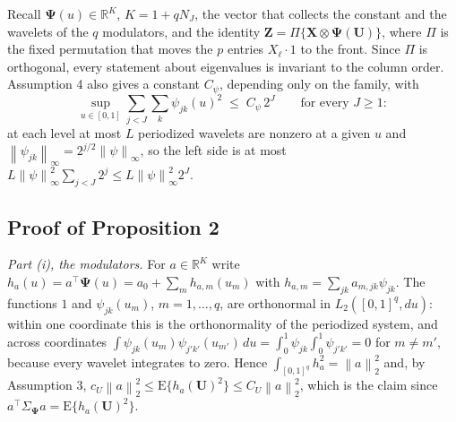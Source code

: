 \documentclass[10pt]{book}
\theoremstyle{definition}
\newcommand{\R}{\mathbb{R}}
\newcommand{\E}{\mathrm{E}}
\newcommand{\T}{^{\top}}
\newcommand{\norm}[1]{\left\lVert #1 \right\rVert}
\newcommand{\cv}{\ell}
\newcommand{\md}{m}
\newcommand{\lev}{j}
\newcommand{\tsl}{k}
\newcommand{\NJ}{N_{J}}
\newcommand{\bX}{\mathbf{X}}
\newcommand{\bU}{\mathbf{U}}
\newcommand{\bZ}{\mathbf{Z}}
\newcommand{\wav}[2]{\psi_{#1#2}}
\newcommand{\Gram}{\Sigma}
\newcommand{\bPsi}{\boldsymbol{\Psi}}
\begin{document}
Recall $\bPsi(u) \in \R^{K}$, $K = 1+q\NJ$, the vector that collects the
constant and the wavelets of the $q$ modulators, and the identity
$\bZ = \Pi\{\bX \otimes \bPsi(\bU)\}$, where $\Pi$ is the fixed permutation
that moves the $p$ entries $X_{\cv}\cdot 1$ to the front. Since $\Pi$ is
orthogonal, every statement about eigenvalues is invariant to the column
order. Assumption 4 also gives a constant $C_\psi$, depending only on the
family, with
\begin{equation}
  \label{eq:pointwise}
  \sup_{u\in[0,1]}\sum_{\lev<J}\sum_{\tsl}\wav{\lev}{\tsl}(u)^2
  \;\le\; C_\psi\,2^{J} \qquad \text{for every } J \ge 1 :
\end{equation}
at each level at most $L$ periodized wavelets are nonzero at a given $u$ and
$\norm{\wav{\lev}{\tsl}}_{\infty} = 2^{\lev/2}\norm{\psi}_{\infty}$, so the
left side is at most
$L\norm{\psi}^2_{\infty}\sum_{\lev<J}2^{\lev} \le L\norm{\psi}^2_{\infty}2^J$.

\subsection*{Proof of Proposition 2}

\emph{Part (i), the modulators.} For $a \in \R^{K}$ write
$h_a(u) = a\T\bPsi(u) = a_0 + \sum_{\md}h_{a,\md}(u_{\md})$ with
$h_{a,\md} = \sum_{\lev\tsl}a_{\md,\lev\tsl}\wav{\lev}{\tsl}$. The functions
$1$ and $\wav{\lev}{\tsl}(u_{\md})$, $\md = 1,\dots,q$, are orthonormal in
$L_2([0,1]^q,du)$: within one coordinate this is the orthonormality of the
periodized system, and across coordinates
$\int\wav{\lev}{\tsl}(u_{\md})\wav{\lev'}{\tsl'}(u_{\md'})\,du =
\int_0^1\wav{\lev}{\tsl}\int_0^1\wav{\lev'}{\tsl'} = 0$ for
$\md \ne \md'$, because every wavelet integrates to zero. Hence
$\int_{[0,1]^q}h_a^2 = \norm{a}_2^2$ and, by Assumption 3,
$c_U\norm{a}_2^2 \le \E\{h_a(\bU)^2\} \le C_U\norm{a}_2^2$, which is the claim
since $a\T\Gram_{\bPsi}a = \E\{h_a(\bU)^2\}$.
\end{document}
